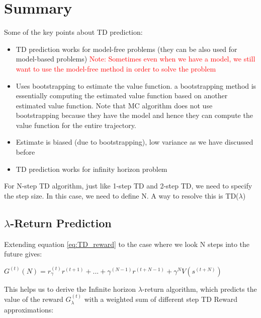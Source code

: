 \documentclass[11pt]{article}
\begin{document}



\section{Summary}
Some of the key points about TD prediction:
\begin{itemize}
  \item TD prediction works for model-free problems (they can be also used for model-based problems) \textcolor{red}{Note: Sometimes even when we have a model, we still want to use the model-free method in order to solve the problem}
  \item Uses bootstrapping to estimate the value function. a bootstrapping method is essentially computing the estimated value function based on another estimated value function. Note that MC algorithm does not use bootstrapping because they have the model and hence they can compute the value function for the entire trajectory. 
  \item Estimate is biased (due to bootstrapping), low variance as we have discussed before
  \item TD prediction works for infinity horizon problem
\end{itemize}

For N-step TD algorithm, just like 1-step TD and 2-step TD,  we need to specify the step size. In this case, we need to define N. A way to resolve this is TD($\lambda$)
\subsection{$\lambda$-Return Prediction}

Extending equation \ref{eq:TD_reward} to the case where we look N steps into the future gives:
\begin{center}\begin{large}
    $G^{(t)}(N) = r^{(t)}_\gamma r^{(t+1)} + ... + \gamma^{(N-1)}r^{(t+N-1)} + \gamma^N V(s^{(t+N)})$
\end{large}\end{center}

This helps us to derive the Infinite horizon $\lambda$-return algorithm, which predicts the value of the reward $G_{\lambda}^{(t)}$ with a weighted sum of different step TD Reward approximations:
\end{document}

